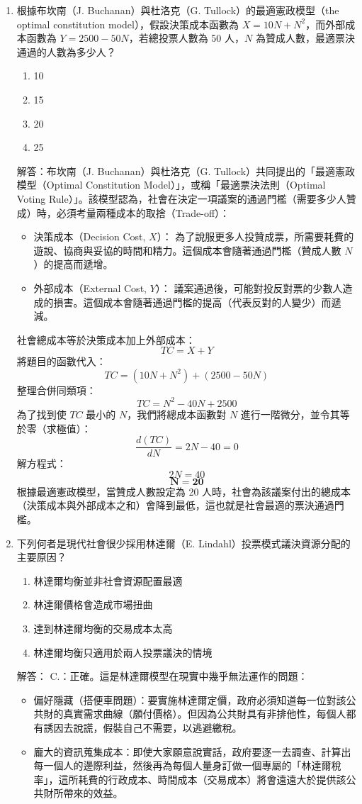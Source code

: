 \documentclass[12pt, a4paper]{article}
\begin{document}
\begin{enumerate}
    \item 根據布坎南（J. Buchanan）與杜洛克（G. Tullock）的最適憲政模型（the optimal constitution model），假設決策成本函數為 \(X=10N+N^2\)，而外部成本函數為 \(Y=2500-50N\)，若總投票人數為 50 人，\(N\) 為贊成人數，最適票決通過的人數為多少人？
    \begin{enumerate}[label=\Alph*.]
        \item 10
        \item 15
        \item 20
        \item 25
    \end{enumerate}
    解答：布坎南（J. Buchanan）與杜洛克（G. Tullock）共同提出的「最適憲政模型（Optimal Constitution Model）」，或稱「最適票決法則（Optimal Voting Rule）」。該模型認為，社會在決定一項議案的通過門檻（需要多少人贊成）時，必須考量兩種成本的取捨（Trade-off）：
    \begin{itemize}
        \item 決策成本（Decision Cost, \(X\)）： 為了說服更多人投贊成票，所需要耗費的遊說、協商與妥協的時間和精力。這個成本會隨著通過門檻（贊成人數 \(N\)）的提高而遞增。
        \item 外部成本（External Cost, \(Y\)）： 議案通過後，可能對投反對票的少數人造成的損害。這個成本會隨著通過門檻的提高（代表反對的人變少）而遞減。
    \end{itemize}
    社會總成本等於決策成本加上外部成本：
    \[
    TC = X + Y
    \]
    將題目的函數代入：
    \[
    TC = (10N + N^2) + (2500 - 50N)
    \]
    整理合併同類項：
    \[
    TC = N^2 - 40N + 2500
    \]
    為了找到使 \(TC\) 最小的 \(N\)，我們將總成本函數對 \(N\) 進行一階微分，並令其等於零（求極值）：
    \[
    \frac{d(TC)}{dN} = 2N - 40 = 0
    \]
    解方程式：
    \[
    2N = 40
    \]
    \[
    \mathbf{N = 20}
    \]
    根據最適憲政模型，當贊成人數設定為 20 人時，社會為該議案付出的總成本（決策成本與外部成本之和）會降到最低，這也就是社會最適的票決通過門檻。

    \item 下列何者是現代社會很少採用林達爾（E. Lindahl）投票模式議決資源分配的主要原因？
    \begin{enumerate}[label=\Alph*.]
        \item 林達爾均衡並非社會資源配置最適
        \item 林達爾價格會造成市場扭曲
        \item 達到林達爾均衡的交易成本太高
        \item 林達爾均衡只適用於兩人投票議決的情境
    \end{enumerate}
    解答：
    C.：正確。這是林達爾模型在現實中幾乎無法運作的問題：
    \begin{itemize}
        \item 偏好隱藏（搭便車問題）：要實施林達爾定價，政府必須知道每一位對該公共財的真實需求曲線（願付價格）。但因為公共財具有非排他性，每個人都有誘因去說謊，假裝自己不需要，以逃避繳稅。
        \item 龐大的資訊蒐集成本：即使大家願意說實話，政府要逐一去調查、計算出每一個人的邊際利益，然後再為每個人量身訂做一個專屬的「林達爾稅率」，這所耗費的行政成本、時間成本（交易成本）將會遠遠大於提供該公共財所帶來的效益。
    \end{itemize}


\end{enumerate}
\end{document}
